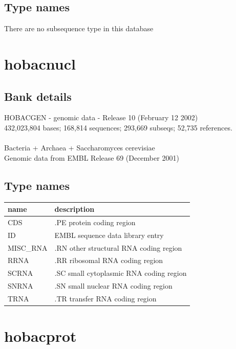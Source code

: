\documentclass{article}
\begin{document}
\begin{Schunk}
\subsection{Type names}
There are no subsequence type in this database
\section{ hobacnucl }
\subsection{Bank details}
HOBACGEN - genomic data - Release 10 (February 12 2002)\\
432,023,804 bases; 168,814 sequences; 293,669 subseqs; 52,735 references.\\
\\
Bacteria + Archaea + Saccharomyces cerevisiae\\
Genomic data from EMBL Release 69 (December 2001)\\


\subsection{Type names}
\noindent\begin{tabular}{ll}
\hline \hline
name & description\\
\hline
CDS & .PE protein coding region \\
ID & EMBL sequence data library entry \\
MISC\_RNA & .RN other structural RNA coding region \\
RRNA & .RR ribosomal RNA coding region \\
SCRNA & .SC small cytoplasmic RNA coding region \\
SNRNA & .SN small nuclear RNA coding region \\
TRNA & .TR transfer RNA coding region \\
\hline \hline
\end{tabular}

\section{ hobacprot }

\end{Schunk}
\end{document}
